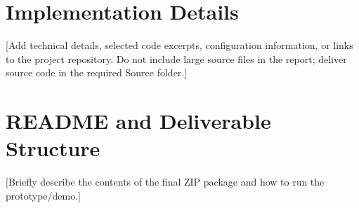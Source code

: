 \documentclass[12pt,a4paper]{report}
\begin{document}
\chapter{Implementation Details}
[Add technical details, selected code excerpts, configuration information, or links to the project repository. Do not include large source files in the report; deliver source code in the required Source folder.]

\chapter{README and Deliverable Structure}
[Briefly describe the contents of the final ZIP package and how to run the prototype/demo.]
\end{document}
